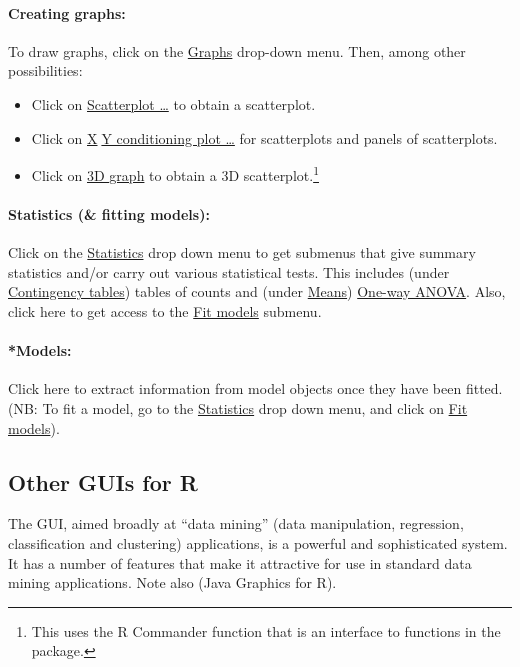 \paragraph{Creating graphs:}
To draw graphs, click on the \underline{Graphs} drop-down menu. Then,
among other possibilities:
\begin{itemize}
\item Click on \underline{Scatterplot \ldots} to obtain a
  scatterplot.
\item Click on \underline{X$\;$Y conditioning plot \ldots}
for  scatterplots and panels of scatterplots.
\item Click on \underline{3D graph} to obtain a 3D
scatterplot.\footnote{This uses
  the R Commander function  that is an interface
  to functions in the  package.}
\end{itemize}

\paragraph{Statistics (\& fitting models):} Click on the
\underline{Statistics} drop down menu to get submenus that give
summary statistics and/or carry out various statistical tests.  This
includes (under \underline{Contingency tables}) tables of counts
and (under \underline{Means}) \underline{One-way ANOVA}.
Also, click here to get access to the \underline{Fit models} submenu.

\paragraph{*Models:} Click here to extract information from model
objects once they have been fitted.  (NB: To fit a model, go to the
\underline{Statistics} drop down menu, and click on \underline{Fit
  models}).

\subsection*{Other GUIs for R}

The  GUI, aimed broadly at ``data mining'' (data
manipulation, regression, classification and clustering) applications,
is a powerful and sophisticated system.  It has a number of features
that make it attractive for use in standard data mining applications.
Note also  (Java Graphics for R).



